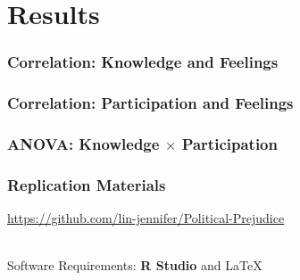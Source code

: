 \documentclass[14pt]{beamer}
\newcommand\tb{\textbf}
\begin{document}
\section{Results}

\begin{frame}
\frametitle{Correlation: Knowledge and Feelings}
\end{frame}

\begin{frame}
\frametitle{Correlation: Participation and Feelings}
\end{frame}

\begin{frame}
\frametitle{ANOVA: Knowledge $\times$ Participation}
\end{frame}


\begin{frame}
\frametitle{Replication Materials}
\begin{center}
	\url{https://github.com/lin-jennifer/Political-Prejudice}
	
~~\\
Software Requirements: \tb{R Studio} and \LaTeX

\end{center}
\end{frame}
\end{document}
